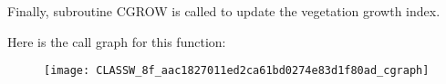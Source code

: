Finally, subroutine C\+G\+R\+O\+W is called to update the vegetation growth index.

Here is the call graph for this function\+:\nopagebreak
\begin{figure}[H]
\begin{center}
\leavevmode
\texttt{[image: CLASSW\_8f\_aac1827011ed2ca61bd0274e83d1f80ad\_cgraph]}
\end{center}
\end{figure}


